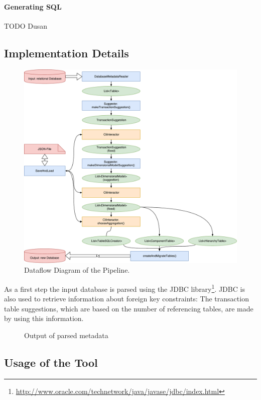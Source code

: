 \paragraph{Generating SQL}
TODO Dusan %

\subsection{Implementation Details}

\begin{figure}
  \centering
  \includegraphics[width=\linewidth]{images/dataFlowDiagram}
  \caption{Dataflow Diagram of the Pipeline.}
  \label{fig:dataflowDiagram}
\end{figure}

As a first step the input database is parsed using the JDBC library\footnote{\url{http://www.oracle.com/technetwork/java/javase/jdbc/index.html}}.
JDBC is also used to retrieve information about foreign key constraints: The transaction table suggestions, which are based on the number of referencing tables, are made by using this information.

\begin{figure}[p]
  
  \caption{Output of parsed metadata}
  \label{fig:metadataOutput}
\end{figure}

\subsection{Usage of the Tool}

